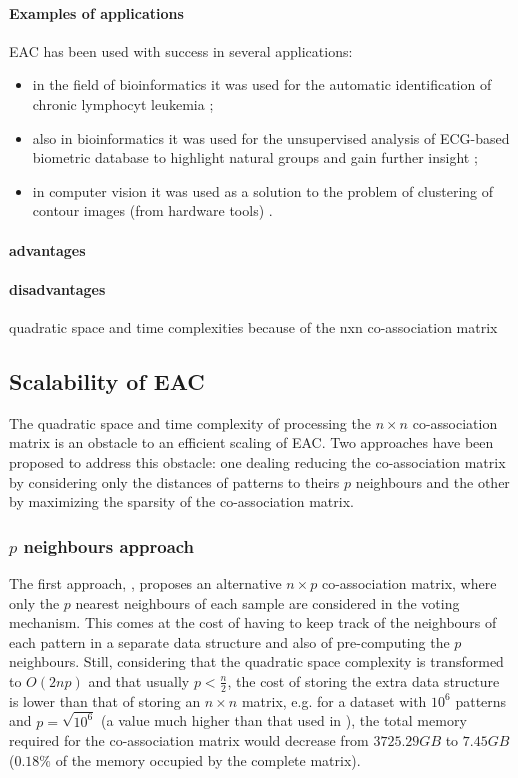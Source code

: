 \paragraph{Examples of applications}

EAC has been used with success in several applications:
\begin{itemize}
	\item in the field of bioinformatics it was used for the automatic identification of chronic lymphocyt leukemia \cite{Qian2010};
	\item also in bioinformatics it was used for the unsupervised analysis of ECG-based biometric database to highlight natural groups and gain further insight \cite{Lourenco2009};
	\item in computer vision it was used as a solution to the problem of clustering of contour images (from hardware tools) \cite{Lourenco2007}.
\end{itemize}



\paragraph{advantages}

\paragraph{disadvantages}
quadratic space and time complexities because of the nxn co-association matrix 


\subsection{Scalability of EAC} 
The quadratic space and time complexity of processing the $n \times n$ co-association matrix is an obstacle to an efficient scaling of EAC. Two approaches have been proposed to address this obstacle: one dealing reducing the co-association matrix by considering only the distances of patterns to theirs $p$ neighbours and the other by maximizing the sparsity of the co-association matrix.

\subsubsection{$p$ neighbours approach}
The first approach, \cite{Fred2005}, proposes an alternative $n \times p$ co-association matrix, where only the $p$ nearest neighbours of each sample are considered in the voting mechanism. This comes at the cost of having to keep track of the neighbours of each pattern in a separate data structure and also of pre-computing the $p$ neighbours. Still, considering that the quadratic space complexity is transformed to $O(2np)$ and that usually $p < \frac{n}{2}$, the cost of storing the extra data structure is lower than that of storing an $n \times n$ matrix, e.g. for a dataset with $10^6$ patterns and $p=\sqrt{10^6}$ (a value much higher than that used in \cite{Fred2005}), the total memory required for the co-association matrix would decrease from $3725.29 GB$ to $7.45 GB$ ($0.18\%$ of the memory occupied by the complete matrix).

